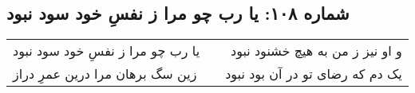 \begin{center}
\section*{شماره ۱۰۸: یا رب چو مرا ز نفسِ خود سود نبود}
\label{sec:108}
\begin{longtable}{l p{0.5cm} r}
یا رب چو مرا ز نفسِ خود سود نبود
&&
و او نیز ز من به هیچ خشنود نبود
\\
زین سگ برهان مرا درین عمرِ دراز
&&
یک دم که رضای تو در آن بود نبود
\\
\end{longtable}
\end{center}
